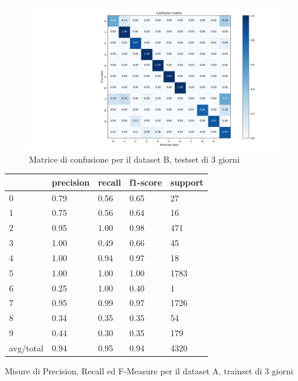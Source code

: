 \documentclass[10pt,a4paper]{article}
\begin{document}
	\begin{figure}[!htbp]
	\includegraphics[width=\linewidth]{immagini/confusion_matrix/b_3d.png}
	\caption{Matrice di confusione per il dataset B, testset di 3 giorni}
	\label{fig:b_3d}
	\end{figure}
	
	
	\begin{table}[!htbp]
    \scriptsize
    \centering
    	\begin{tabularx}{0.56\textwidth}{l | llll}
    		{} & {precision} & {recall} & {f1-score} & {support} \\
    		\midrule
            {0} & {0.79} & {0.56} & {0.65} & {27} \\
            {1} & {0.75} & {0.56} & {0.64} & {16} \\
            {2} & {0.95} & {1.00} & {0.98} & {471} \\
            {3} & {1.00} & {0.49} & {0.66} & {45} \\
            {4} & {1.00} & {0.94} & {0.97} & {18} \\
            {5} & {1.00} & {1.00} & {1.00} & {1783} \\
            {6} & {0.25} & {1.00} & {0.40} & {1} \\
            {7} & {0.95} & {0.99} & {0.97} & {1726} \\
            {8} & {0.34} & {0.35} & {0.35} & {54} \\
            {9} & {0.44} & {0.30} & {0.35} & {179} \\
            {avg/total} & {0.94} & {0.95} & {0.94} & {4320} \\
    	\end{tabularx}
    	 {Misure di Precision, Recall ed F-Measure per il dataset A, trainset di 3 giorni}
    	\label{tab:a_3d}
    \end{table}
    
\end{document}
